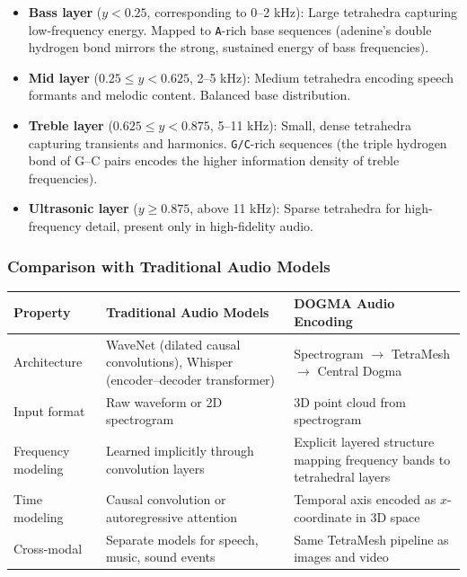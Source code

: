 \begin{itemize}[leftmargin=1.5em]
  \item \textbf{Bass layer} ($y < 0.25$, corresponding to 0--2 kHz): Large tetrahedra capturing low-frequency energy. Mapped to \texttt{A}-rich base sequences (adenine's double hydrogen bond mirrors the strong, sustained energy of bass frequencies).
  \item \textbf{Mid layer} ($0.25 \le y < 0.625$, 2--5 kHz): Medium tetrahedra encoding speech formants and melodic content. Balanced base distribution.
  \item \textbf{Treble layer} ($0.625 \le y < 0.875$, 5--11 kHz): Small, dense tetrahedra capturing transients and harmonics. \texttt{G/C}-rich sequences (the triple hydrogen bond of G--C pairs encodes the higher information density of treble frequencies).
  \item \textbf{Ultrasonic layer} ($y \ge 0.875$, above 11 kHz): Sparse tetrahedra for high-frequency detail, present only in high-fidelity audio.
\end{itemize}

\subsubsection{Comparison with Traditional Audio Models}

\begin{center}
\renewcommand{\arraystretch}{1.15}
\begin{tabularx}{0.95\textwidth}{l Y Y}
\toprule
\textbf{Property} & \textbf{Traditional Audio Models} & \textbf{DOGMA Audio Encoding} \\
\midrule
Architecture & WaveNet (dilated causal convolutions), Whisper (encoder--decoder transformer) & Spectrogram $\to$ TetraMesh $\to$ Central Dogma \\
Input format & Raw waveform or 2D spectrogram & 3D point cloud from spectrogram \\
Frequency modeling & Learned implicitly through convolution layers & Explicit layered structure mapping frequency bands to tetrahedral layers \\
Time modeling & Causal convolution or autoregressive attention & Temporal axis encoded as $x$-coordinate in 3D space \\
Cross-modal & Separate models for speech, music, sound events & Same TetraMesh pipeline as images and video \\
\bottomrule
\end{tabularx}
\end{center}

